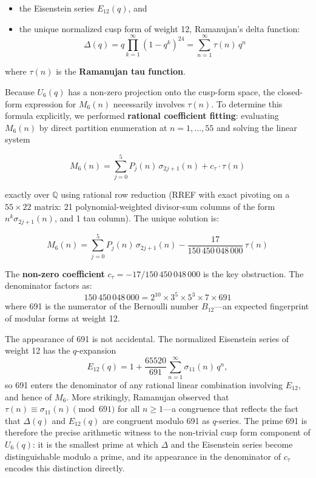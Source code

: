 \documentclass[
  11pt,
]{article}
\providecommand{\tightlist}{%
  \setlength{\itemsep}{0pt}\setlength{\parskip}{0pt}}
\begin{document}
\begin{itemize}
\tightlist
\item
  the Eisenstein series \(E_{12}(q)\), and
\item
  the unique normalized cusp form of weight 12, Ramanujan's delta
  function:
  \[\Delta(q) = q \prod_{k=1}^{\infty} (1-q^k)^{24} = \sum_{n=1}^{\infty} \tau(n)\,q^n\]
\end{itemize}

where \(\tau(n)\) is the \textbf{Ramanujan tau function}.

Because \(U_6(q)\) has a non-zero projection onto the cusp-form space,
the closed-form expression for \(M_6(n)\) necessarily involves
\(\tau(n)\). To determine this formula explicitly, we performed
\textbf{rational coefficient fitting}: evaluating \(M_6(n)\) by direct
partition enumeration at \(n = 1, \ldots, 55\) and solving the linear
system

\[M_6(n) = \sum_{j=0}^{5} P_j(n)\,\sigma_{2j+1}(n) + c_\tau \cdot \tau(n)\]

exactly over \(\mathbb{Q}\) using rational row reduction (RREF with
exact pivoting on a \(55 \times 22\) matrix: 21 polynomial-weighted
divisor-sum columns of the form \(n^k \sigma_{2j+1}(n)\), and 1 tau
column). The unique solution is:

\[M_6(n) = \sum_{j=0}^{5} P_j(n)\,\sigma_{2j+1}(n) - \frac{17}{150\,450\,048\,000}\,\tau(n)\]

The \textbf{non-zero coefficient} \(c_\tau = -17/150\,450\,048\,000\) is
the key obstruction. The denominator factors as:
\[150\,450\,048\,000 = 2^{10} \times 3^5 \times 5^3 \times 7 \times 691\]
where 691 is the numerator of the Bernoulli number \(B_{12}\)---an
expected fingerprint of modular forms at weight 12.

The appearance of 691 is not accidental. The normalized Eisenstein
series of weight 12 has the \(q\)-expansion
\[E_{12}(q) = 1 + \frac{65520}{691}\sum_{n=1}^{\infty}\sigma_{11}(n)\,q^n,\]
so 691 enters the denominator of any rational linear combination
involving \(E_{12}\), and hence of \(M_6\). More strikingly, Ramanujan
observed that \(\tau(n) \equiv \sigma_{11}(n) \pmod{691}\) for all
\(n \geq 1\)---a congruence that reflects the fact that \(\Delta(q)\)
and \(E_{12}(q)\) are congruent modulo 691 as \(q\)-series. The prime
691 is therefore the precise arithmetic witness to the non-trivial cusp
form component of \(U_6(q)\): it is the smallest prime at which
\(\Delta\) and the Eisenstein series become distinguishable modulo a
prime, and its appearance in the denominator of \(c_\tau\) encodes this
distinction directly.
\end{document}
